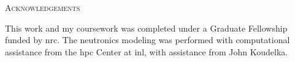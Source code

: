 \begin{center}
   {\LARGE\textsc{Acknowledgements}}

   This work and my coursework was completed under a Graduate Fellowship funded by \acf{nrc}. The neutronics modeling was performed with computational assistance from the \acf{hpc} Center at \acf{inl}, with assistance from John Koudelka.
\end{center}

